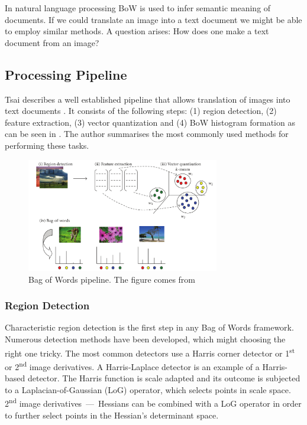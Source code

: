 \documentclass[11pt,twoside]{article}
\begin{document}
  In natural language processing BoW is used to infer semantic meaning of documents. If we could translate an image into a text document we might be able to employ similar methods. A question arises: How does one make a text document from an image?

  \subsection{Processing Pipeline}	
    Tsai describes a well established pipeline that allows translation of images into text documents \cite{tsai2012bag}. It consists of the following steps: (1) region detection, (2) feature extraction, (3) vector quantization and (4) BoW histogram formation as can be seen in . The author summarises the most commonly used methods for performing these tasks. 

    \begin{figure}[!ht]
    \centering
    \includegraphics[width=0.75\textwidth]{../figs/tsai2012}
    \caption{Bag of Words pipeline. The figure comes from \cite{tsai2012bag}}
    \label{fig:bow_pipeline}
    \end{figure}
	
  \subsubsection{Region Detection}
    Characteristic region detection is the first step in any Bag of Words framework. Numerous detection methods have been developed, which might choosing the right one tricky. The most common detectors use a Harris corner detector or 1\textsuperscript{st} or 2\textsuperscript{nd} image derivatives. A Harris-Laplace detector is an example of a Harris-based detector. The Harris function is scale adapted and its outcome is subjected to a Laplacian-of-Gaussian (LoG) operator, which selects points in scale space. 2\textsuperscript{nd} image derivatives~---~Hessians can be combined with a LoG operator in order to further select points in the Hessian's determinant space.
\end{document}
